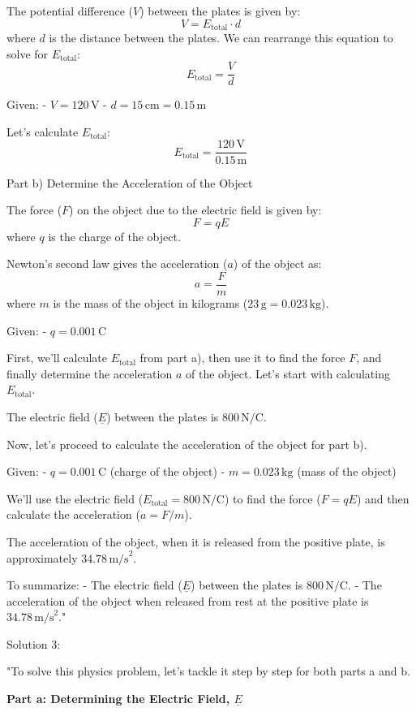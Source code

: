 The potential difference (\( V \)) between the plates is given by:
\[ V = E_{\text{total}} \cdot d \]
where \( d \) is the distance between the plates. We can rearrange this equation to solve for \( E_{\text{total}} \):
\[ E_{\text{total}} = \frac{V}{d} \]

Given:
- \( V = 120 \, \text{V} \)
- \( d = 15 \, \text{cm} = 0.15 \, \text{m} \)

Let's calculate \( E_{\text{total}} \):
\[ E_{\text{total}} = \frac{120 \, \text{V}}{0.15 \, \text{m}} \]

Part b) Determine the Acceleration of the Object

The force (\( F \)) on the object due to the electric field is given by:
\[ F = qE \]
where \( q \) is the charge of the object.

Newton's second law gives the acceleration (\( a \)) of the object as:
\[ a = \frac{F}{m} \]
where \( m \) is the mass of the object in kilograms (\( 23 \, \text{g} = 0.023 \, \text{kg} \)).

Given:
- \( q = 0.001 \, \text{C} \)

First, we'll calculate \( E_{\text{total}} \) from part a), then use it to find the force \( F \), and finally determine the acceleration \( a \) of the object. Let's start with calculating \( E_{\text{total}} \).

The electric field (\( \underline{E} \)) between the plates is \( 800 \, \text{N/C} \).

Now, let's proceed to calculate the acceleration of the object for part b).

Given:
- \( q = 0.001 \, \text{C} \) (charge of the object)
- \( m = 0.023 \, \text{kg} \) (mass of the object)

We'll use the electric field (\( E_{\text{total}} = 800 \, \text{N/C} \)) to find the force (\( F = qE \)) and then calculate the acceleration (\( a = F/m \)).

The acceleration of the object, when it is released from the positive plate, is approximately \( 34.78 \, \text{m/s}^2 \).

To summarize:
- The electric field (\( \underline{E} \)) between the plates is \( 800 \, \text{N/C} \).
- The acceleration of the object when released from rest at the positive plate is \( 34.78 \, \text{m/s}^2 \)."

Solution 3:

"To solve this physics problem, let's tackle it step by step for both parts a and b.

\textbf{Part a: Determining the Electric Field, \( \underline{E} \)}

